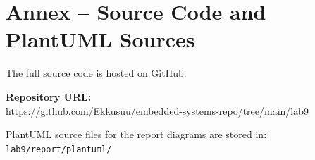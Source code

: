 \documentclass[12pt]{article}
\begin{document}
\FloatBarrier
\section*{Annex -- Source Code and PlantUML Sources}

The full source code is hosted on GitHub:

\bigskip
\noindent\textbf{Repository URL:}\\
\url{https://github.com/Ekkusuu/embedded-systems-repo/tree/main/lab9}

\bigskip
\noindent PlantUML source files for the report diagrams are stored in:\\
\texttt{lab9/report/plantuml/}
\end{document}
